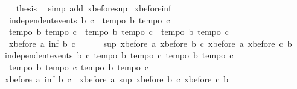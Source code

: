 \begin{isabellebody}
\ \ \isamarkupfalse%
\ {\isacharquery}thesis\ \isamarkupfalse%
\ {\isacharparenleft}simp\ add{\isacharcolon}\ xbefore{\isacharunderscore}sup{\isacharunderscore}{}{\isacharparenright}\isanewline
{}\isamarkupfalse%
%
\endisatagproof
{\isafoldproof}%
%
\isadelimproof
\isanewline
%
\endisadelimproof
\isanewline
{}\isamarkupfalse%
\ xbefore{\isacharunderscore}inf{\isacharunderscore}{}{\isacharcolon}\ \isanewline
\ \ {\isachardoublequoteopen}independent{\isacharunderscore}events\ b\ c\ {\isasymLongrightarrow}\ {\isasymlbrakk}tempo{}\ b{\isacharsemicolon}\ tempo{}\ c{\isasymrbrakk}\ {\isasymLongrightarrow}\ \isanewline
\ \ {\isasymlbrakk}tempo{}\ b{\isacharsemicolon}\ tempo{}\ c{\isasymrbrakk}\ {\isasymLongrightarrow}\ {\isasymlbrakk}tempo{}\ b{\isacharsemicolon}\ tempo{}\ c{\isasymrbrakk}\ {\isasymLongrightarrow}\ {\isasymlbrakk}tempo{}\ b{\isacharsemicolon}\ tempo{}\ c{\isasymrbrakk}\ {\isasymLongrightarrow}\ \isanewline
\ \ xbefore\ a\ {\isacharparenleft}inf\ b\ c{\isacharparenright}\ {\isacharequal}\ \isanewline
\ \ \ \ sup\ {\isacharparenleft}xbefore\ a\ {\isacharparenleft}xbefore\ b\ c{\isacharparenright}{\isacharparenright}\ {\isacharparenleft}xbefore\ a\ {\isacharparenleft}xbefore\ c\ b{\isacharparenright}{\isacharparenright}{\isachardoublequoteclose}\isanewline
%
\isadelimproof
%
\endisadelimproof
%
\isatagproof
{}\isamarkupfalse%
{\isacharminus}\isanewline
\ \ \isamarkupfalse%
\ {\isachardoublequoteopen}independent{\isacharunderscore}events\ b\ c{\isachardoublequoteclose}\ {\isachardoublequoteopen}tempo{}\ b{\isachardoublequoteclose}\ {\isachardoublequoteopen}tempo{}\ c{\isachardoublequoteclose}\ {\isachardoublequoteopen}tempo{}\ b{\isachardoublequoteclose}\ {\isachardoublequoteopen}tempo{}\ c{\isachardoublequoteclose}\ \isanewline
\ \ {\isachardoublequoteopen}tempo{}\ b{\isachardoublequoteclose}\ {\isachardoublequoteopen}tempo{}\ c{\isachardoublequoteclose}\ {\isachardoublequoteopen}tempo{}\ b{\isachardoublequoteclose}\ {\isachardoublequoteopen}tempo{}\ c{\isachardoublequoteclose}\isanewline
\ \ \isamarkupfalse%
\ {\isachardoublequoteopen}xbefore\ a\ {\isacharparenleft}inf\ b\ c{\isacharparenright}\ {\isacharequal}\ xbefore\ a\ {\isacharparenleft}sup\ {\isacharparenleft}xbefore\ b\ c{\isacharparenright}\ {\isacharparenleft}xbefore\ c\ b{\isacharparenright}{\isacharparenright}{\isachardoublequoteclose}\isanewline

\end{isabellebody}
